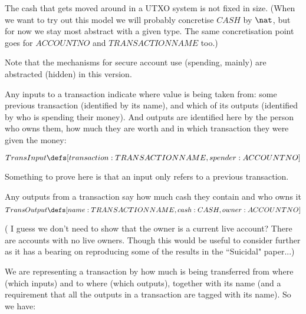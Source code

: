 \documentclass[11pt]{amsart}
\begin{document}
The cash that gets moved around in a UTXO system is not fixed in size. (When we want to try out this model we will probably concretise $CASH$ by $\nat$, but for now we stay most abstract with a given type. The same concretisation point goes for $ACCOUNTNO$ and $TRANSACTIONNAME$ too.)


Note that the mechanisms for secure account use (spending, mainly) are abstracted (hidden) in this version. 


Any inputs to a transaction indicate where value is being taken from: some previous
 transaction (identified by its name), and which of its outputs (identified by who is spending their money). And outputs are identified here by the person who owns them, how much they are worth and in which transaction they were given the money:
 

 \[
  TransInput \defs [transaction : TRANSACTIONNAME, spender : ACCOUNTNO]
\]


Something to prove here is that an input only refers to a previous transaction.

Any outputs from a transaction say how much cash they contain and who owns it
\[
  TransOutput \defs [name : TRANSACTIONNAME, cash : CASH, owner : ACCOUNTNO]
 \]
 
( I guess we don't need to show that the owner is a current live account? There are accounts with no live owners. Though this would be useful to consider further as it has a bearing on reproducing some of the results in the ``Suicidal" paper...)
                       
 We are representing a transaction by how much is being transferred from where (which inputs)
 and to where (which outputs), together with its name (and a requirement that all the outputs in a transaction are tagged with its name). So we have:
 
\end{document}
